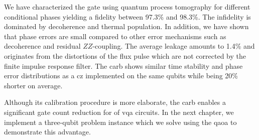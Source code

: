  We have characterized the gate using quantum process tomography for different conditional phases yielding a fidelity between 97.3\% and 98.3\%. The infidelity is dominated by decoherence and thermal population. In addition, we have shown that phase errors are small compared to other error mechanisms such as decoherence and residual $ZZ$-coupling. The average leakage amounts to 1.4\% and originates from the distortions of the flux pulse which are not corrected by the finite impulse response filter. The \gls{carb} shows similar time stability and phase error distributions as a \gls{cz} implemented on the same qubits while being 20\% shorter on average. 
 
 Although its calibration procedure is more elaborate, the \gls{carb} enables a significant gate count reduction for of \gls{vqa} circuits. In the next chapter, we implement a three-qubit problem instance which we solve using the \gls{qaoa} to demonstrate this advantage.



